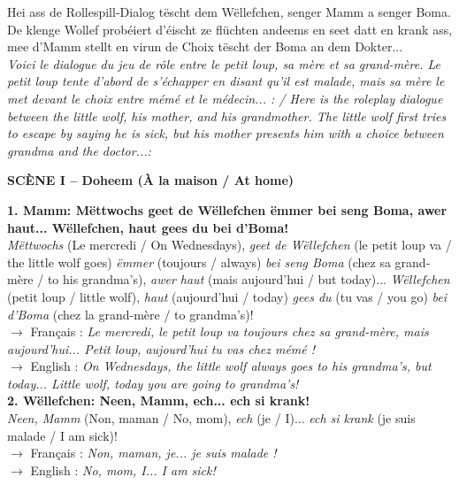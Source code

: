 Hei ass de Rollespill-Dialog tëscht dem Wëllefchen, senger Mamm a senger Boma. De klenge Wollef probéiert d'éischt ze flüchten andeems en seet datt en krank ass, mee d'Mamm stellt en virun de Choix tëscht der Boma an dem Dokter... \\
\textit{Voici le dialogue du jeu de rôle entre le petit loup, sa mère et sa grand-mère. Le petit loup tente d'abord de s'échapper en disant qu'il est malade, mais sa mère le met devant le choix entre mémé et le médecin... : / Here is the roleplay dialogue between the little wolf, his mother, and his grandmother. The little wolf first tries to escape by saying he is sick, but his mother presents him with a choice between grandma and the doctor...:}

\vspace{1em}

\noindent\textbf{SCÈNE I -- Doheem (À la maison / At home)}

\noindent\textbf{1. Mamm: Mëttwochs geet de Wëllefchen ëmmer bei seng Boma, awer haut... Wëllefchen, haut gees du bei d'Boma!}\\
\textit{Mëttwochs} (Le mercredi / On Wednesdays), \textit{geet de Wëllefchen} (le petit loup va / the little wolf goes) \textit{ëmmer} (toujours / always) \textit{bei seng Boma} (chez sa grand-mère / to his grandma's), \textit{awer haut} (mais aujourd'hui / but today)... \textit{Wëllefchen} (petit loup / little wolf), \textit{haut} (aujourd'hui / today) \textit{gees du} (tu vas / you go) \textit{bei d'Boma} (chez la grand-mère / to grandma's)!\\
$\rightarrow$ Français : \textit{Le mercredi, le petit loup va toujours chez sa grand-mère, mais aujourd'hui... Petit loup, aujourd'hui tu vas chez mémé !}\\
$\rightarrow$ English : \textit{On Wednesdays, the little wolf always goes to his grandma's, but today... Little wolf, today you are going to grandma's!}\\[0.5em]

\noindent\textbf{2. Wëllefchen: Neen, Mamm, ech... ech si krank!}\\
\textit{Neen, Mamm} (Non, maman / No, mom), \textit{ech} (je / I)... \textit{ech si krank} (je suis malade / I am sick)!\\
$\rightarrow$ Français : \textit{Non, maman, je... je suis malade !}\\
$\rightarrow$ English : \textit{No, mom, I... I am sick!}\\[0.5em]

